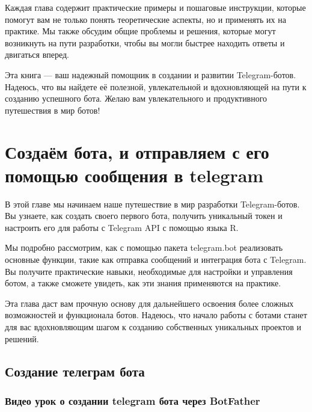 \documentclass[
]{book}
\begin{document}
Каждая глава содержит практические примеры и пошаговые инструкции, которые помогут вам не только понять теоретические аспекты, но и применять их на практике. Мы также обсудим общие проблемы и решения, которые могут возникнуть на пути разработки, чтобы вы могли быстрее находить ответы и двигаться вперед.

Эта книга --- ваш надежный помощник в создании и развитии Telegram-ботов. Надеюсь, что вы найдете её полезной, увлекательной и вдохновляющей на пути к созданию успешного бота. Желаю вам увлекательного и продуктивного путешествия в мир ботов!

\chapter{Создаём бота, и отправляем с его помощью сообщения в telegram}\label{ux441ux43eux437ux434ux430ux451ux43c-ux431ux43eux442ux430-ux438-ux43eux442ux43fux440ux430ux432ux43bux44fux435ux43c-ux441-ux435ux433ux43e-ux43fux43eux43cux43eux449ux44cux44e-ux441ux43eux43eux431ux449ux435ux43dux438ux44f-ux432-telegram}

В этой главе мы начинаем наше путешествие в мир разработки Telegram-ботов. Вы узнаете, как создать своего первого бота, получить уникальный токен и настроить его для работы с Telegram API с помощью языка R.

Мы подробно рассмотрим, как с помощью пакета telegram.bot реализовать основные функции, такие как отправка сообщений и интеграция бота с Telegram. Вы получите практические навыки, необходимые для настройки и управления ботом, а также сможете увидеть, как эти знания применяются на практике.

Эта глава даст вам прочную основу для дальнейшего освоения более сложных возможностей и функционала ботов. Надеюсь, что начало работы с ботами станет для вас вдохновляющим шагом к созданию собственных уникальных проектов и решений.

\section{Создание телеграм бота}\label{ux441ux43eux437ux434ux430ux43dux438ux435-ux442ux435ux43bux435ux433ux440ux430ux43c-ux431ux43eux442ux430}

\subsection{Видео урок о создании telegram бота через BotFather}\label{ux432ux438ux434ux435ux43e-ux443ux440ux43eux43a-ux43e-ux441ux43eux437ux434ux430ux43dux438ux438-telegram-ux431ux43eux442ux430-ux447ux435ux440ux435ux437-botfather}
\end{document}
